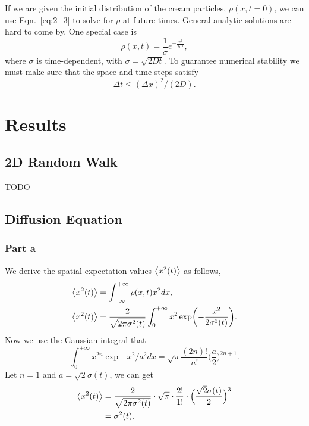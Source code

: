 \documentclass[notitlepage,aps,prd,nofootinbib]{revtex4-1}
\begin{document}
If we are given the initial distribution of the cream particles, $\rho(x, t=0)$, we can use Eqn.~\eqref{eq:2_3} to solve for $\rho$ at future times. General analytic solutions are hard to come by. One special case is 
\begin{equation}
	\rho(x, t) = \frac{1}{\sigma}e^{-\frac{x^{2}}{2\sigma^{2}}},
\end{equation}
where $\sigma$ is time-dependent, with $\sigma = \sqrt{2Dt}$. To guarantee numerical stability we must make sure that the space and time steps satisfy
\begin{equation}
	\Delta t \leq (\Delta x)^{2}/(2D).
\end{equation}

\clearpage
\section{Results}
\label{sec:results}
\subsection{2D Random Walk}
TODO
\newpage
\subsection{Diffusion Equation}
\label{subsec:results_2}
\subsubsection{Part a}
\label{subsubsec:results_2_a}
We derive the spatial expectation values $\expval{x^{2}(t)}$ as follows,
\begin{align}
	\expval{x^{2}(t)} &= \int_{-\infty}^{+\infty} \rho(x, t) x^{2} dx, \\
	\expval{x^{2}(t)} &= \frac{2}{\sqrt{2\pi\sigma^{2}(t)}} \int_{0}^{+\infty} x^{2} \exp(-\frac{x^{2}}{2\sigma^{2}(t)}).
\end{align}
Now we use the Gaussian integral that
\begin{equation}
	\int_{0}^{+\infty} x^{2n} \exp{-x^{2}/a^{2}} dx = \sqrt{\pi} \frac{(2n)!}{n!}\Big( \frac{a}{2} \Big)^{2n+1}.
\end{equation}
Let $n = 1$ and $a = \sqrt{2}\sigma(t)$, we can get
\begin{equation}
	\begin{split}
		\expval{x^{2}(t)} &= \frac{2}{\sqrt{2\pi\sigma^{2}(t)}} \cdot \sqrt{\pi}\cdot \frac{2!}{1!} \cdot \Big( \frac{\sqrt{2}\sigma(t)}{2} \Big)^{3} \\
		&= \sigma^{2}(t).
	\end{split} 
\end{equation}
\end{document}
